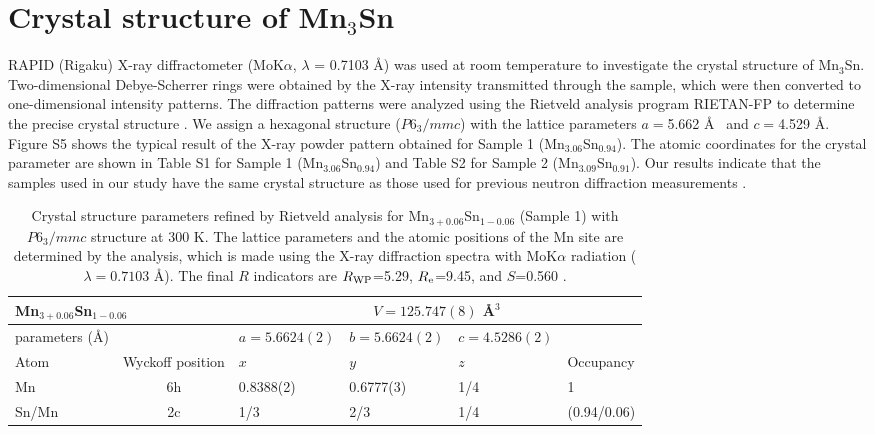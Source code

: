 \documentclass[amsmath,amssymb]{nature}
\begin{document}
	\section{ Crystal structure of  Mn$_3$Sn}
	RAPID (Rigaku) X-ray diffractometer (MoK$\alpha$, $\lambda$ = 0.7103 \AA) was used at room temperature to investigate the crystal structure of Mn$_3$Sn.  Two-dimensional Debye-Scherrer rings were obtained by the  X-ray intensity transmitted through the sample, which were then converted to one-dimensional intensity patterns.  The diffraction patterns were analyzed using the Rietveld analysis program RIETAN-FP to determine the precise crystal structure \cite{izumi2007} . We assign a hexagonal structure ($P6_3/mmc$) with the lattice parameters $a=$5.662 \AA~ and $c=$4.529 \AA \cite{tomiyoshi1982polarized}. Figure S5 shows the typical result of the X-ray powder pattern obtained for Sample 1 (Mn$_{3.06}$Sn$_{0.94}$). The atomic coordinates for the crystal parameter are shown in Table S1 for Sample 1 (Mn$_{3.06}$Sn$_{0.94}$) and Table S2 for Sample 2 (Mn$_{3.09}$Sn$_{0.91}$). Our results indicate that the samples used in our study have the same crystal structure as those used for previous neutron diffraction measurements\cite{tomiyoshi1982polarized,Brown1990}
	\color{black}. 
	
	
	
	\begin{table*}[b]
		\caption{\label{tab:table1}  Crystal structure parameters refined by Rietveld analysis for Mn$_{3+0.06}$Sn$_{1-0.06}$ (Sample 1) with $P6_3/mmc$ structure at 300 K. The lattice parameters and the atomic positions of the Mn site are determined by the analysis, which is made using the X-ray diffraction spectra with MoK$\alpha$ radiation ($\lambda = 0.7103$ \AA). The final $R$ indicators are $R_{\rm WP}$=5.29, $R_{\rm e}$=9.45, and $S$=0.560 \cite{izumi2007}.}
		
		\begin{tabular}{lrllll}
			\multicolumn{2}{l}{Mn$_{3+0.06}$Sn$_{1-0.06}$} &\multicolumn{4}{c}{$V=125.747(8)$ \AA $^3$} \\
			\hline\hline
			\multicolumn{1}{l}{parameters (\AA)} &\multicolumn{1}{c}{} & \multicolumn{1}{c}{$a=5.6624(2)$} & \multicolumn{1}{c}{$b=5.6624(2)$} & \multicolumn{1}{c}{ $c=4.5286(2)$}&\multicolumn{1}{c}{} \\
			\hline
			\multicolumn{1}{l}{ Atom                    } &\multicolumn{1}{c}{Wyckoff position} & $x$ & $y$ &  $z$& Occupancy\\
			\multicolumn{1}{l}{ Mn                   } &\multicolumn{1}{c}{6h} &  0.8388(2) &  0.6777(3) &   1/4& 1\\
			\multicolumn{1}{l}{ Sn/Mn               } &\multicolumn{1}{c}{2c} &  1/3 &  2/3 &   1/4& (0.94/0.06)\\
			\hline\hline
		\end{tabular}
		\label{tab:Ret}
		
	\end{table*}
	
\end{document}
